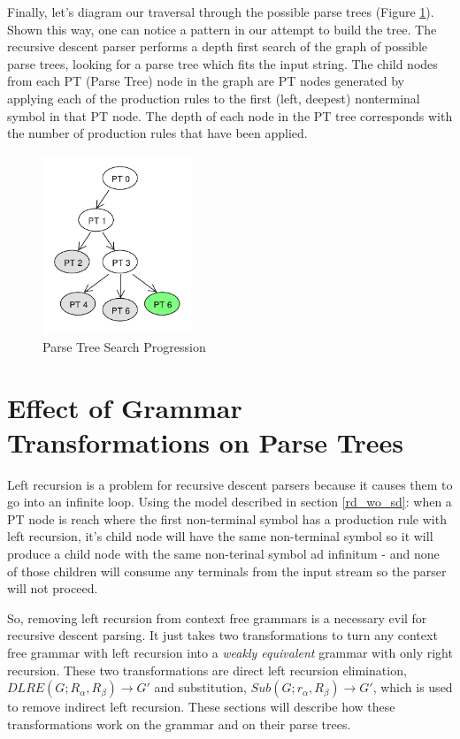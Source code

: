 \documentclass[11pt]{article}
\begin{document}
Finally, let's diagram our traversal through the possible parse trees (Figure \ref{fig:rdp_7}). Shown this way, one can notice
a pattern in our attempt to build the tree. The recursive descent parser performs a depth first search of the 
graph of possible parse trees, looking for a parse tree which fits the input string.
The child nodes from each PT (Parse Tree) node in the graph are PT nodes generated by
applying each of the production rules to the first (left, deepest) nonterminal symbol in that PT node.
The depth of each node in the PT tree corresponds with the number of production rules that have been applied.

\begin{figure}[h!]
    \centering
    \includegraphics[width=0.4\textwidth,natwidth=30,natheight=30]{rdp_7.pdf}
    \caption{Parse Tree Search Progression}
    \label{fig:rdp_7}
\end{figure}

\clearpage

\section{Effect of Grammar Transformations on Parse Trees}
Left recursion is a problem for recursive descent parsers because it causes them to
go into an infinite loop. Using the model described in section \ref{rd_wo_sd}:
when a PT node is reach where the first non-terminal symbol has a production rule with
left recursion, it's child node will have the same non-terminal symbol so it will produce
a child node with the same non-terinal symbol ad infinitum - and none of those children will
consume any terminals from the input stream so the parser will not proceed. 

So, removing left recursion from context free grammars is a necessary evil for recursive descent parsing.
It just takes two transformations to turn any context free grammar with left recursion
into a {\em weakly equivalent} grammar with only right recursion.
These two transformations are direct left recursion elimination, 
$DLRE(G; R_\alpha, R_\beta) \rightarrow G'$ and substitution, 
$Sub(G; r_\alpha, R_\beta) \rightarrow G'$, which is used to
remove indirect left recursion. \cite{aho, lewis}
These sections will describe how these transformations work on the grammar
and on their parse trees.
\end{document}
